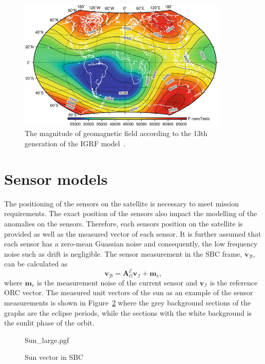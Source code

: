 \begin{figure}[!htb]
	\centering
	\includegraphics[width = 10cm]{Figures/IGRF-13th.png}
	\caption{The magnitude of geomagnetic field according to the 13th generation of the IGRF model~\cite{koskinen2022radiation}.}
	\label{fig:IGRF13th}
\end{figure}

\section{Sensor models}
The positioning of the sensors on the satellite is necessary to meet mission requirements. The exact position of the sensors also impact the modelling of the anomalies on the sensors. Therefore, each sensors position on the satellite is provided as well as the measured vector of each sensor. It is further assumed that each sensor has a zero-mean Guassian noise and consequently, the low frequency noise such as drift is negligible. The sensor measurement in the SBC frame, $\mathbf{v}_{\mathcal{B}}$,  can be calculated as
\begin{equation}
\mathbf{v}_{\mathcal{B}} = \boldsymbol{A}_{\mathcal{O}}^{\mathcal{E}} \mathbf{v}_{\mathcal{I}} + \mathbf{m}_v,
\end{equation}
where $\mathbf{m}_v$ is the measurement noise of the current sensor and $\mathbf{v}_{\mathcal{I}}$ is the reference ORC vector. The measured unit vectors of the sun as an example of the sensor measurements is shown in Figure~\ref{fig:SunSensorPlot} where the grey background sections of the graphs are the eclipse periods, while the sections with the white background is the sunlit phase of the orbit.

\begin{figure}[!htb]
	\centering
	\def\pgfwidth{7cm}
	{Sun_large.pgf}
	
	\caption{Sun vector in SBC}
	\label{fig:SunSensorPlot}
\end{figure}

